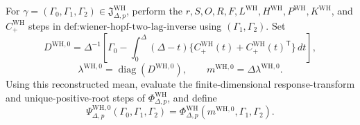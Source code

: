 For \(\gamma=(\Gamma_0,\Gamma_1,\Gamma_2)\in\mathfrak J_{\Delta,p}^{\mathrm{WH}}\), perform the \(r,S,O,R,F,L^{\mathrm{WH}},H^{\mathrm{WH}},P^{\mathrm{WH}},K^{\mathrm{WH}}\), and \(C_{+}^{\mathrm{WH}}\) steps in \(\text{def:wiener-hopf-two-lag-inverse}\) using \((\Gamma_1,\Gamma_2)\).  Set
\[
 D^{\mathrm{WH},0}=\Delta^{-1}\!\left[
 \Gamma_0-\int_0^\Delta(\Delta-t)
 \{C_{+}^{\mathrm{WH}}(t)+C_{+}^{\mathrm{WH}}(t)^{\mathsf T}\}\,dt
 \right],
\]
\[
 \lambda^{\mathrm{WH},0}=\operatorname{diag}(D^{\mathrm{WH},0}),
 \qquad m^{\mathrm{WH},0}=\Delta\lambda^{\mathrm{WH},0}.
\]
Using this reconstructed mean, evaluate the finite-dimensional response-transform and unique-positive-root steps of \(\Phi_{\Delta,p}^{\mathrm{WH}}\), and define
\[
 \Psi_{\Delta,p}^{\mathrm{WH},0}(\Gamma_0,\Gamma_1,\Gamma_2)
 =\Phi_{\Delta,p}^{\mathrm{WH}}(m^{\mathrm{WH},0},\Gamma_1,\Gamma_2).
\]